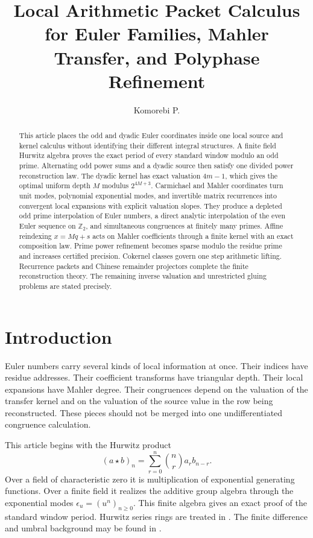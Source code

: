 \documentclass{aomart}
\title[Local arithmetic packet calculus]{Local Arithmetic Packet Calculus for Euler Families, Mahler Transfer, and Polyphase Refinement}
\author[Komorebi P.]{Komorebi P.}
\theoremstyle{definition}
\theoremstyle{remark}
\newcommand{\starh}{\mathbin{\star}}
\begin{document}
\begin{abstract}
This article places the odd and dyadic Euler coordinates inside one local source and kernel calculus without identifying their different integral structures. A finite field Hurwitz algebra proves the exact period of every standard window modulo an odd prime. Alternating odd power sums and a dyadic source then satisfy one divided power reconstruction law. The dyadic kernel has exact valuation \(4m-1\), which gives the optimal uniform depth \(M\) modulus \(2^{4M+3}\). Carmichael and Mahler coordinates turn unit modes, polynomial exponential modes, and invertible matrix recurrences into convergent local expansions with explicit valuation slopes. They produce a depleted odd prime interpolation of Euler numbers, a direct analytic interpolation of the even Euler sequence on \(\mathbb Z_2\), and simultaneous congruences at finitely many primes. Affine reindexing \(x=Mq+s\) acts on Mahler coefficients through a finite kernel with an exact composition law. Prime power refinement becomes sparse modulo the residue prime and increases certified precision. Cokernel classes govern one step arithmetic lifting. Recurrence packets and Chinese remainder projectors complete the finite reconstruction theory. The remaining inverse valuation and unrestricted gluing problems are stated precisely.
\end{abstract}
\maketitle
\thispagestyle{plain}

\section{Introduction}\label{sec:introduction}

Euler numbers carry several kinds of local information at once. Their indices have residue addresses. Their coefficient transforms have triangular depth. Their local expansions have Mahler degree. Their congruences depend on the valuation of the transfer kernel and on the valuation of the source value in the row being reconstructed. These pieces should not be merged into one undifferentiated congruence calculation.

This article begins with the Hurwitz product
\[
(a\starh b)_n
=
\sum_{r=0}^{n}
\binom nr a_rb_{n-r}.
\]
Over a field of characteristic zero it is multiplication of exponential generating functions. Over a finite field it realizes the additive group algebra through the exponential modes \(\epsilon_u=(u^n)_{n\geq0}\). This finite algebra gives an exact proof of the standard window period. Hurwitz series rings are treated in \cite{Keigher1997,BarberoCerrutiMurru2018}. The finite difference and umbral background may be found in \cite{Roman1984,Comtet1974,GrahamKnuthPatashnik1994}.
\end{document}
